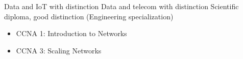 \documentclass[10pt,a4paper,ragged2e,withhyper]{altacv}
\begin{document}
\begin{paracol}{2}
Data and IoT with distinction
\smallbreak
\divider
{}
Data and telecom with distinction
\smallbreak
\divider
{}
Scientific diploma, good distinction (Engineering specialization)

\begin{itemize}
  \item CCNA 1: Introduction to Networks
  \item CCNA 3: Scaling Networks
\end{itemize}

\end{paracol}
\end{document}
